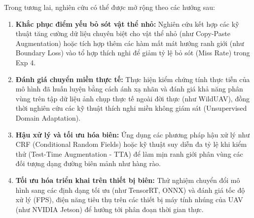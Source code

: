 Trong tương lai, nghiên cứu có thể được mở rộng theo các hướng sau:
\begin{enumerate}[leftmargin=1.4cm]
  \item \textbf{Khắc phục điểm yếu bỏ sót vật thể nhỏ:} Nghiên cứu kết hợp các kỹ thuật tăng cường dữ liệu chuyên biệt cho vật thể nhỏ (như Copy-Paste Augmentation) hoặc tích hợp thêm các hàm mất mát hướng ranh giới (như Boundary Loss) vào tổ hợp thích nghi để giảm tỷ lệ bỏ sót (Miss Rate) trong Exp 4.
  \item \textbf{Đánh giá chuyển miền thực tế:} Thực hiện kiểm chứng tính thực tiễn của mô hình đã huấn luyện bằng cách ánh xạ nhãn và đánh giá khả năng phân vùng trên tập dữ liệu ảnh chụp thực tế ngoài đời thực (như WildUAV), đồng thời nghiên cứu các kỹ thuật thích nghi miền không giám sát (Unsupervised Domain Adaptation).
  \item \textbf{Hậu xử lý và tối ưu hóa biên:} Ứng dụng các phương pháp hậu xử lý như CRF (Conditional Random Fields) hoặc kỹ thuật suy diễn đa tỷ lệ khi kiểm thử (Test-Time Augmentation - TTA) để làm mịn ranh giới phân vùng các đối tượng dạng đường biên mảnh như hàng rào.
  \item \textbf{Tối ưu hóa triển khai trên thiết bị biên:} Thử nghiệm chuyển đổi mô hình sang các định dạng tối ưu (như TensorRT, ONNX) và đánh giá tốc độ xử lý (FPS), điện năng tiêu thụ trên các thiết bị máy tính nhúng của UAV (như NVIDIA Jetson) để hướng tới phân đoạn thời gian thực.
\end{enumerate}
